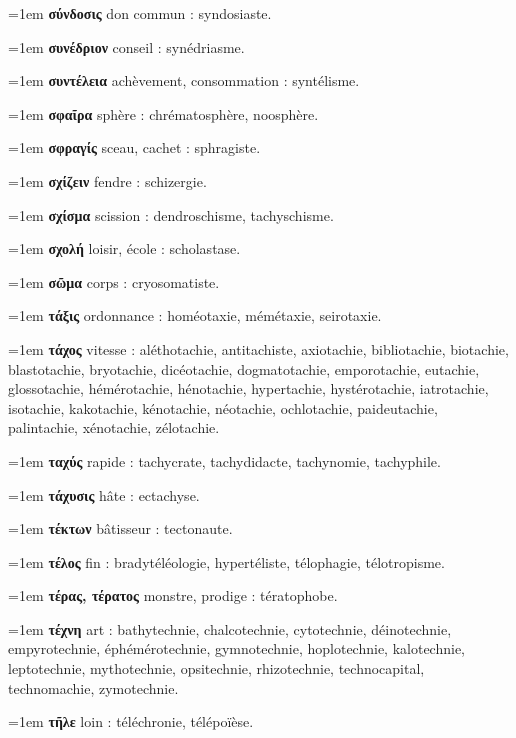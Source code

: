 \hangindent=1em \textbf{σύνδοσις} don commun : syndosiaste.\par
\hangindent=1em \textbf{συνέδριον} conseil : synédriasme.\par
\hangindent=1em \textbf{συντέλεια} achèvement, consommation : syntélisme.\par
\hangindent=1em \textbf{σφαῖρα} sphère : chrématosphère, noosphère.\par
\hangindent=1em \textbf{σφραγίς} sceau, cachet : sphragiste.\par
\hangindent=1em \textbf{σχίζειν} fendre : schizergie.\par
\hangindent=1em \textbf{σχίσμα} scission : dendroschisme, tachyschisme.\par
\hangindent=1em \textbf{σχολή} loisir, école : scholastase.\par
\hangindent=1em \textbf{σῶμα} corps : cryosomatiste.\par
\hangindent=1em \textbf{τάξις} ordonnance : homéotaxie, mémétaxie, seirotaxie.\par
\hangindent=1em \textbf{τάχος} vitesse : aléthotachie, antitachiste, axiotachie, bibliotachie, biotachie, blastotachie, bryotachie, dicéotachie, dogmatotachie, emporotachie, eutachie, glossotachie, hémérotachie, hénotachie, hypertachie, hystérotachie, iatrotachie, isotachie, kakotachie, kénotachie, néotachie, ochlotachie, paideutachie, palintachie, xénotachie, zélotachie.\par
\hangindent=1em \textbf{ταχύς} rapide : tachycrate, tachydidacte, tachynomie, tachyphile.\par
\hangindent=1em \textbf{τάχυσις} hâte : ectachyse.\par
\hangindent=1em \textbf{τέκτων} bâtisseur : tectonaute.\par
\hangindent=1em \textbf{τέλος} fin : bradytéléologie, hypertéliste, télophagie, télotropisme.\par
\hangindent=1em \textbf{τέρας, τέρατος} monstre, prodige : tératophobe.\par
\hangindent=1em \textbf{τέχνη} art : bathytechnie, chalcotechnie, cytotechnie, déinotechnie, empyrotechnie, éphémérotechnie, gymnotechnie, hoplotechnie, kalotechnie, leptotechnie, mythotechnie, opsitechnie, rhizotechnie, technocapital, technomachie, zymotechnie.\par
\hangindent=1em \textbf{τῆλε} loin : téléchronie, télépoïèse.\par
